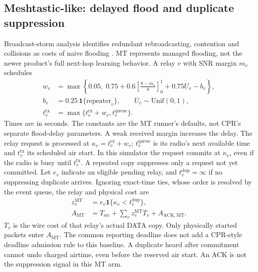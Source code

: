 \documentclass[conference,letterpaper,10pt]{IEEEtran}
\begin{document}
\subsection{Meshtastic-like: delayed flood and duplicate suppression}
Broadcast-storm analysis identifies redundant rebroadcasting, contention
and collisions as costs of naive flooding \cite{ni1999broadcaststorm}.
MT represents managed flooding, not the newer product's full next-hop
learning behavior. A relay $v$ with SNR margin $m_v$ schedules
\begin{equation}
\begin{aligned}
w_v&=\max\!\left\{0.05,\;0.75+
  0.6\left[\frac{8-m_v}{8}\right]_0^1+0.75U_v-b_v\right\},\\
b_v&=0.25\,\mathbf 1\{\mathrm{repeater}_v\},\qquad
U_v\sim\mathrm{Unif}(0,1),\\
t_v^{\mathrm{tx}}&=\max\{t_v^{\mathrm{rx}}+w_v,t_v^{\mathrm{queue}}\}.
\end{aligned}
\label{eq:meshtastic-delay}
\end{equation}
Times are in seconds. The constants are the MT runner's defaults, not
CPR's separate flood-delay parameters. A weak received margin increases the
delay. The relay request is processed at $\kappa_v=t_v^{\mathrm{rx}}+w_v$;
$t_v^{\mathrm{queue}}$ is its radio's next available time and
$t_v^{\mathrm{tx}}$ its scheduled air start. In this simulator the request
commits at $\kappa_v$, even if the radio is busy until $t_v^{\mathrm{tx}}$.
A repeated copy suppresses only a request not yet committed.
Let $e_v$ indicate an eligible pending relay, and $t_v^{\mathrm{dup}}=\infty$
if no suppressing duplicate arrives. Ignoring exact-time ties, whose order is
resolved by the event queue, the relay and physical cost are
\begin{equation}
\begin{aligned}
z_v^{\mathrm{MT}}&=e_v\mathbf 1\{\kappa_v<t_v^{\mathrm{dup}}\},\\
A_{\mathrm{MT}}&=T_{\mathrm{src}}+
 \sum_vz_v^{\mathrm{MT}}T_v+A_{\mathrm{ACK,MT}}.
\end{aligned}
\label{eq:meshtastic-cost}
\end{equation}
$T_v$ is the wire cost of that relay's actual DATA copy. Only physically
started packets enter $A_{\mathrm{MT}}$. The common reporting deadline does
not add a CPR-style deadline admission rule to this baseline.
A duplicate heard after commitment cannot undo charged airtime, even before
the reserved air start. An ACK is not the suppression signal in this MT arm.
\end{document}
